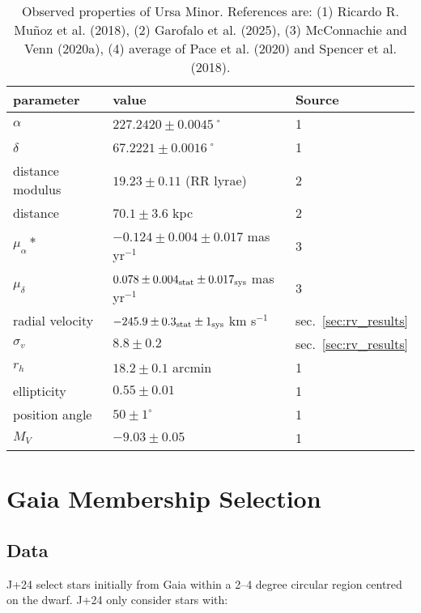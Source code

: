 \begin{table*}[t]
\centering
\caption[Observed Properties of Ursa Minor]{\label{tbl:umi_obs_props}Observed properties of Ursa Minor. References are: (1) Ricardo R. Muñoz et al. (2018), (2) Garofalo et al. (2025), (3) McConnachie and Venn (2020a), (4) average of Pace et al. (2020) and Spencer et al. (2018). }
\label{tbl:umi_obs_props}
\begin{tabular}{lll}
\toprule
parameter & value & Source\\
\midrule
$\alpha$ & $ 227.2420 \pm 0.0045$˚ & 1\\
$\delta$ & $67.2221 \pm 0.0016$˚ & 1\\
distance modulus & $19.23 \pm 0.11$ (RR lyrae) & 2\\
distance & $70.1 \pm 3.6$ kpc & 2\\
$\mu_\alpha*$ & $-0.124 \pm 0.004 \pm 0.017$ mas yr$^{-1}$ & 3\\
$\mu_\delta$ & $0.078 \pm 0.004_{\rm stat} \pm 0.017_{\rm sys}$ mas yr$^{-1}$ & 3\\
radial velocity & $-245.9 \pm 0.3_{\rm stat} \pm 1_{\rm sys}$ km s$^{-1}$ & sec. \ref{sec:rv_results}\\
$\sigma_v$ & $8.8 \pm 0.2$ & sec. \ref{sec:rv_results}\\
$r_h$ & $18.2 \pm 0.1$ arcmin & 1\\
ellipticity & $0.55 \pm 0.01$ & 1\\
position angle & $50 \pm 1^\circ$ & 1\\
$M_V$ & $-9.03 \pm 0.05$ & 1\\
\bottomrule
\end{tabular}
\end{table*}

\section{Gaia Membership Selection}\label{gaia-membership-selection}

\subsection{Data}\label{data}

J+24 select stars initially from Gaia within a 2--4 degree circular
region centred on the dwarf. J+24 only consider stars with:

